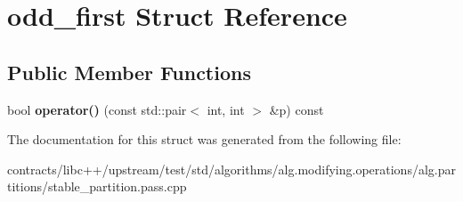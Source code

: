 \hypertarget{structodd__first}{}\section{odd\+\_\+first Struct Reference}
\label{structodd__first}
\subsection*{Public Member Functions}
\begin{DoxyCompactItemize}
\item 
\mbox{\label{structodd__first_a99c17e666e50d391207672a079419fb9}} 
bool {\bfseries operator()} (const std\+::pair$<$ int, int $>$ \&p) const
\end{DoxyCompactItemize}


The documentation for this struct was generated from the following file\+:\begin{DoxyCompactItemize}
\item 
contracts/libc++/upstream/test/std/algorithms/alg.\+modifying.\+operations/alg.\+partitions/stable\+\_\+partition.\+pass.\+cpp\end{DoxyCompactItemize}
